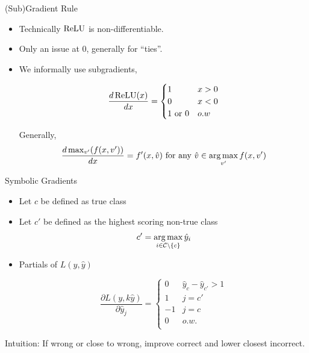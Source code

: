 \documentclass{beamer}
\begin{document}
\begin{frame}{(Sub)Gradient Rule}

  \begin{itemize}
  \item Technically $\relu$ is non-differentiable.
  \item Only an issue at $0$, generally for ``ties''.
  \item We informally use subgradients, 
    
    \[\frac{d \relu(x)}{d x} =
      \begin{cases}
         1 & x > 0 \\
         0 & x < 0 \\
         1 \mathrm{\ or\ } 0 & o.w \\
      \end{cases}
    \]

    Generally,
    \[\frac{d \max_{v'}(f(x, v'))}{d x} = f'(x, \hat{v}) \ \mathrm{for\ any} \ \hat{v} \in \argmax_{v'} f(x, v')
    \]
    
  \end{itemize}
\end{frame}

\begin{frame}{Symbolic Gradients}

  \begin{itemize}
  \item   Let $c$ be defined as true class
  \item   Let $c'$ be defined as the highest scoring non-true class 
    \[c' = \argmax_{i \in \mcC \setminus\{c\}} \hat{y}_i \] 
  \item Partials of $L(y, \hat{y})$

  \[ \frac{\partial L(y,k \hat{y})}{\partial \hat{y}_j} =
      \begin{cases}
         0 & \hat{y}_c - \hat{y}_{c'} > 1  \\
         1 & j = c' \\
         -1 & j = c \\
         0 & o.w. \\ 
      \end{cases}
  \]
  \end{itemize}
  Intuition: If wrong or close to wrong, improve correct and lower closest incorrect.
\end{frame}
\end{document}
